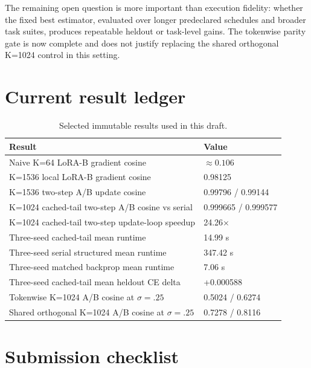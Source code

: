 \documentclass[11pt]{article}
\begin{document}
The remaining open question is more important than execution fidelity:
whether the fixed best estimator, evaluated over longer predeclared schedules
and broader task suites, produces repeatable heldout or task-level gains. The
tokenwise parity gate is now complete and does not justify replacing the
shared orthogonal K=1024 control in this setting.




\appendix
\section{Current result ledger}

\begin{table}[h]
\centering
\caption{Selected immutable results used in this draft.}
\begin{tabular}{ll}
\toprule
Result & Value \\
\midrule
Naive K=64 LoRA-B gradient cosine & $\approx 0.106$ \\
K=1536 local LoRA-B gradient cosine & 0.98125 \\
K=1536 two-step A/B update cosine & 0.99796 / 0.99144 \\
K=1024 cached-tail two-step A/B cosine vs serial & 0.999665 / 0.999577 \\
K=1024 cached-tail two-step update-loop speedup & 24.26$\times$ \\
Three-seed cached-tail mean runtime & 14.99 s \\
Three-seed serial structured mean runtime & 347.42 s \\
Three-seed matched backprop mean runtime & 7.06 s \\
Three-seed cached-tail mean heldout CE delta & +0.000588 \\
Tokenwise K=1024 A/B cosine at $\sigma=.25$ & 0.5024 / 0.6274 \\
Shared orthogonal K=1024 A/B cosine at $\sigma=.25$ & 0.7278 / 0.8116 \\
\bottomrule
\end{tabular}
\end{table}

\section{Submission checklist}
\end{document}
